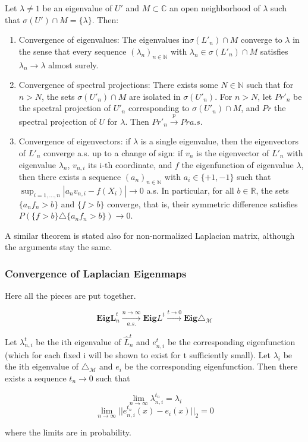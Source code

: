 \begin{theorem}
	Let $\lambda\neq 1 $ be an eigenvalue of $U'$ and $M\subset \mathbb C$ an open neighborhood of $\lambda$ such that $\sigma(U')\cap M=\{\lambda\}$. Then:
	\begin{enumerate}
		\item Convergence of eigenvalues: The eigenvalues in$\sigma(L'_n)\cap M$ converge to $\lambda$ in the sense that every sequence $(\lambda_n)_{n\in\mathbb N}$ with $\lambda_n\in\sigma(L'_n)\cap M$ satisfies $\lambda_n\rightarrow \lambda$ almost surely.
		\item Convergence of spectral projections: There exists some $N\in\mathbb N$ such that for $n>N$, the sets $\sigma(U'_n)\cap M$ are isolated in $\sigma(U'_n)$. For $n>N$, let $Pr'_n$ be the spectral projection of $U'_n$ corresponding to $\sigma(U'_n)\cap M$, and $Pr$ the spectral projection of $U$ for $\lambda$. Then $Pr'_n\xrightarrow p Pr a.s.$
		\item Convergence of eigenvectors: if $\lambda$ is a single eigenvalue, then the eigenvectors of $L'_n$ converge a.s. up to a change of sign: if $v_n$ is the eigenvector
		of $L'_n$ with eigenvalue $\lambda_n$, $v_{n,i}$ its i-th coordinate, and $f$ the eigenfunction of eigenvalue $\lambda$, then there exists a sequence $(a_n)_{n\in\mathbb N}$ with $a_i \in \{+1,-1\}$ such that $\sup_{i=1,...,n} |a_nv_{n,i} - f(X_i)| \rightarrow 0$ a.s. In particular, for all $b \in\mathbb R$, the sets $\{a_nf_n > b\}$ and $\{f > b\}$ converge, that is, their symmetric difference satisfies $P(\{f > b\}\triangle\{a_nf_n > b\}) \rightarrow 0$.
	\end{enumerate}
\end{theorem}

A similar theorem is stated also for non-normalized Laplacian matrix, although the arguments stay the same.
\subsubsection{Convergence of Laplacian Eigenmaps}
Here all the pieces are put together. 

$$ \mathbf{Eig} \mathbf{ L}^t_n \xrightarrow[a.s.]{n\to\infty} \mathbf{Eig} L^t \xrightarrow{t\to0} \mathbf{Eig} \triangle_\mathcal M $$

\begin{theorem}
	Let $\lambda_{n,i}^t$ be the ith eigenvalue of $\hat L_n^t$ and $e^t_{n,i}$ be the corresponding eigenfunction (which for each fixed i will be shown to exist for t sufficiently small). Let $\lambda_{i}$ be the ith eigenvalue of $\triangle_\mathcal M$ and $e_{i}$ be the corresponding eigenfunction. Then there exists a sequence $t_n\rightarrow 0$ such that
	
	$$\lim_{n\rightarrow\infty} \lambda_{n,i}^{t_n}=\lambda_i$$
	$$\lim_{n\rightarrow\infty}||e_{n,i}^{t_n}(x) - e_i(x)||_2 = 0$$
	
	where the limits are in probability.
	
\end{theorem}

